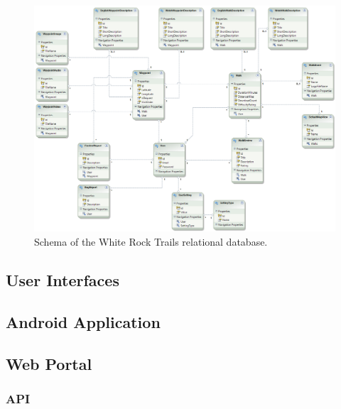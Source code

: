 \documentclass[11pt,a4paper]{article}
\begin{document}
\begin{figure}[h!]
\centering
\includegraphics[angle=90, width=1\linewidth]{./img/DatabaseSchema}
\caption{Schema of the White Rock Trails relational database.}
\label{fig:DatabaseSchema}
\end{figure}


\subsection{User Interfaces}

\subsection{Android Application}

\subsection{Web Portal}

\subsubsection{API}
\end{document}
